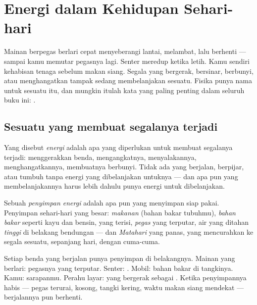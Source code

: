 \chapter{Energi dalam Kehidupan Sehari-hari}\label{ch:g5:everyday-energy}

Mainan berpegas berlari cepat menyeberangi lantai, melambat, lalu
berhenti --- sampai kamu memutar pegasnya lagi. Senter meredup ketika
 letih. Kamu sendiri kehabisan tenaga sebelum makan siang.
Segala yang bergerak, bersinar, berbunyi, atau menghangatkan tampak
sedang membelanjakan sesuatu. Fisika punya nama untuk sesuatu itu, dan
mungkin itulah kata yang paling penting dalam seluruh buku ini:
.

\section{Sesuatu yang membuat segalanya terjadi}

\begin{definition}[Energi]\label{def:g5:everyday-energy:energy}
Yang disebut \emph{energi} adalah apa yang diperlukan
untuk membuat segalanya terjadi: menggerakkan benda, mengangkatnya,
menyalakannya, menghangatkannya, membuatnya berbunyi. Tidak ada yang
berjalan, berpijar, atau tumbuh tanpa energi yang dibelanjakan
untuknya --- dan apa pun yang membelanjakannya harus lebih dahulu
punya energi untuk dibelanjakan.
\end{definition}

\begin{definition}\label{def:g5:everyday-energy:store}
Sebuah \emph{penyimpan energi} adalah apa pun
yang menyimpan  siap pakai. Penyimpan sehari-hari yang besar:
\emph{makanan} (bahan bakar tubuhmu), \emph{bahan bakar} seperti kayu
dan bensin, \emph{} yang terisi, \emph{pegas} yang terputar,
air yang ditahan \emph{tinggi} di belakang bendungan --- dan
\emph{Matahari} yang panas, yang mencurahkan  ke segala sesuatu,
sepanjang hari, dengan cuma-cuma.
\end{definition}

\begin{example}\label{ex:g5:everyday-energy:spot}
Setiap benda yang berjalan punya penyimpan di belakangnya. Mainan yang
berlari: pegasnya yang terputar. Senter: . Mobil: bahan
bakar di tangkinya. Kamu: sarapanmu. Perahu layar:  yang bergerak
sebagai . Ketika penyimpannya habis --- pegas terurai, 
kosong, tangki kering, waktu makan siang mendekat --- berjalannya pun
berhenti.
\end{example}

